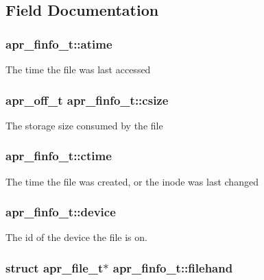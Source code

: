 \subsection{Field Documentation}
\hypertarget{structapr__finfo__t_ad78874e5751e9bba30debb0826eb96a7}{
\subsubsection[{atime}]{ apr\-\_\-finfo\-\_\-t\-::atime}}\label{structapr__finfo__t_ad78874e5751e9bba30debb0826eb96a7}
The time the file was last accessed \hypertarget{structapr__finfo__t_aeaa4a4def98ad4f162e05c2e2292321d}{
\subsubsection[{csize}]{\setlength{\rightskip}{0pt plus 5cm}apr\-\_\-off\-\_\-t apr\-\_\-finfo\-\_\-t\-::csize}}\label{structapr__finfo__t_aeaa4a4def98ad4f162e05c2e2292321d}
The storage size consumed by the file \hypertarget{structapr__finfo__t_aebbdb3dc755d825de3dce901cfba0883}{
\subsubsection[{ctime}]{ apr\-\_\-finfo\-\_\-t\-::ctime}}\label{structapr__finfo__t_aebbdb3dc755d825de3dce901cfba0883}
The time the file was created, or the inode was last changed \hypertarget{structapr__finfo__t_a38cbfbff641284065481f5907d59c8bf}{
\subsubsection[{device}]{ apr\-\_\-finfo\-\_\-t\-::device}}\label{structapr__finfo__t_a38cbfbff641284065481f5907d59c8bf}
The id of the device the file is on. \hypertarget{structapr__finfo__t_a7858e3d9c5f6ed062d9ff7f5c79b6336}{
\subsubsection[{filehand}]{\setlength{\rightskip}{0pt plus 5cm}struct {\bf apr\-\_\-file\-\_\-t}$\ast$ apr\-\_\-finfo\-\_\-t\-::filehand}}\label{structapr__finfo__t_a7858e3d9c5f6ed062d9ff7f5c79b6336}

